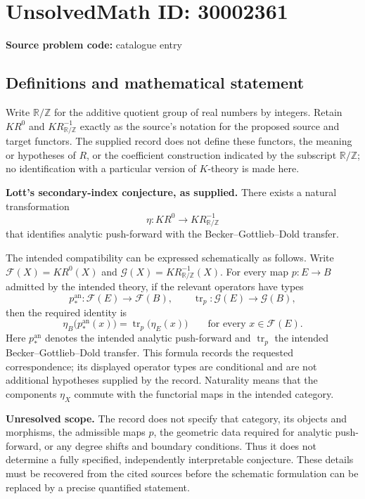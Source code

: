 \documentclass[11pt]{article}
\newcommand{\Z}{\mathbb{Z}}
\newcommand{\R}{\mathbb{R}}
\begin{document}
\section*{UnsolvedMath ID: 30002361}
\textbf{Source problem code:} catalogue entry
\subsection{Definitions and mathematical statement}
Write \(\R/\Z\) for the additive quotient group of real numbers by integers. Retain \(KR^0\) and \(KR_{\R/\Z}^{-1}\) exactly as the source's notation for the proposed source and target functors. The supplied record does not define these functors, the meaning or hypotheses of \(R\), or the coefficient construction indicated by the subscript \(\R/\Z\); no identification with a particular version of \(K\)-theory is made here.

\textbf{Lott's secondary-index conjecture, as supplied.} There exists a natural transformation
\[
\eta\colon KR^0\longrightarrow KR_{\R/\Z}^{-1}
\]
that identifies analytic push-forward with the Becker--Gottlieb--Dold transfer.

The intended compatibility can be expressed schematically as follows. Write \(\mathcal F(X)=KR^0(X)\) and \(\mathcal G(X)=KR_{\R/\Z}^{-1}(X)\). For every map \(p\colon E\to B\) admitted by the intended theory, if the relevant operators have types
\[
p_*^{\mathrm{an}}\colon\mathcal F(E)\to\mathcal F(B),
\qquad
\operatorname{tr}_p\colon\mathcal G(E)\to\mathcal G(B),
\]
then the required identity is
\[
\eta_B\bigl(p_*^{\mathrm{an}}(x)\bigr)
=
\operatorname{tr}_p\bigl(\eta_E(x)\bigr)
\qquad\text{for every }x\in\mathcal F(E).
\]
Here \(p_*^{\mathrm{an}}\) denotes the intended analytic push-forward and \(\operatorname{tr}_p\) the intended Becker--Gottlieb--Dold transfer. This formula records the requested correspondence; its displayed operator types are conditional and are not additional hypotheses supplied by the record. Naturality means that the components \(\eta_X\) commute with the functorial maps in the intended category.

\textbf{Unresolved scope.} The record does not specify that category, its objects and morphisms, the admissible maps \(p\), the geometric data required for analytic push-forward, or any degree shifts and boundary conditions. Thus it does not determine a fully specified, independently interpretable conjecture. These details must be recovered from the cited sources before the schematic formulation can be replaced by a precise quantified statement.
\end{document}

